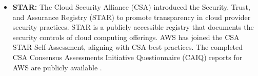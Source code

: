 \begin{itemize}
    \item \textbf{STAR:} The Cloud Security Alliance (CSA) introduced the Security, Trust, and Assurance Registry (STAR) to promote transparency in cloud provider security practices. STAR is a publicly accessible registry that documents the security controls of cloud computing offerings. AWS has joined the CSA STAR Self-Assessment, aligning with CSA best practices. The completed CSA Consensus Assessments Initiative Questionnaire (CAIQ) reports for AWS are publicly available \cite{AWSCSA}.
\end{itemize}

